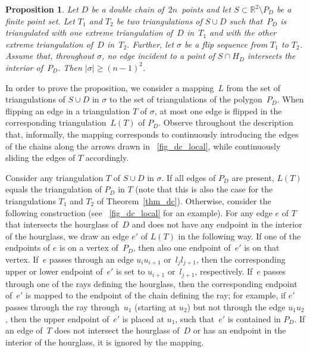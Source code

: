 \documentclass[11pt,a4paper]{article}
\newtheorem{proposition}[theorem]{Proposition}
\begin{document}
\begin{proposition}\label{prop_no_outer}
Let $D$ be a double chain of~$2n$~points and let $S \subset \mathbb{R}^2 \setminus P_D$ be a finite point set.
Let $T_1$ and $T_2$ be two triangulations of $S \cup D$ such that~$P_D$ is triangulated with one extreme triangulation of~$D$ in~$T_1$ and with the other extreme triangulation of~$D$ in~$T_2$.
Further, let $\sigma$ be a flip sequence from $T_1$ to $T_2$.
Assume that, throughout $\sigma$, no edge incident to a point of $S \cap H_D$ intersects the interior of~$P_D$.
Then $|\sigma| \geq (n-1)^2$.
\end{proposition}

In order to prove the proposition, we consider a mapping~$L$ from the set of triangulations of $S \cup D$ in $\sigma$ to the set of triangulations of the polygon~$P_D$.
When flipping an edge in a triangulation $T$ of $\sigma$, at most one edge is flipped in the corresponding triangulation~$L(T)$ of $P_D$.
Observe throughout the description that, informally, the mapping corresponds to continuously introducing the edges of the chains along the arrows drawn in \figurename~\ref{fig_dc_local}, while continuously sliding the edges of $T$ accordingly.


Consider any triangulation $T$ of $S \cup D$ in $\sigma$.
If all edges of $P_D$ are present, $L(T)$ equals the triangulation of $P_D$ in $T$ (note that this is also the case for the triangulations $T_1$ and $T_2$ of Theorem~\ref{thm_dc}).
Otherwise, consider the following construction (see \figurename~\ref{fig_dc_local} for an example).
For any edge $e$ of $T$ that intersects the hourglass of~$D$ and does not have any endpoint in the interior of the hourglass, we draw an edge $e'$ of $L(T)$ in the following way.
If one of the endpoints of $e$ is on a vertex of~$P_D$, then also one endpoint of~$e'$ is on that vertex.
If~$e$ passes through an edge $u_i u_{i+1}$ or~$l_j l_{j+1}$, then the corresponding upper or lower endpoint of~$e'$ is set to $u_{i+1}$ or~$l_{j+1}$, respectively.
If~$e$ passes through one of the rays defining the hourglass, then the corresponding endpoint of~$e'$ is mapped to the endpoint of the chain defining the ray;
for example, if $e'$ passes through the ray through~$u_1$ (starting at $u_2$) but not through the edge $u_1 u_2$, then the upper endpoint of~$e'$ is placed at $u_1$, such that~$e'$ is contained in $P_D$.
If an edge of~$T$ does not intersect the hourglass of~$D$ or has an endpoint in the interior of the hourglass, it is ignored by the mapping.
\end{document}
